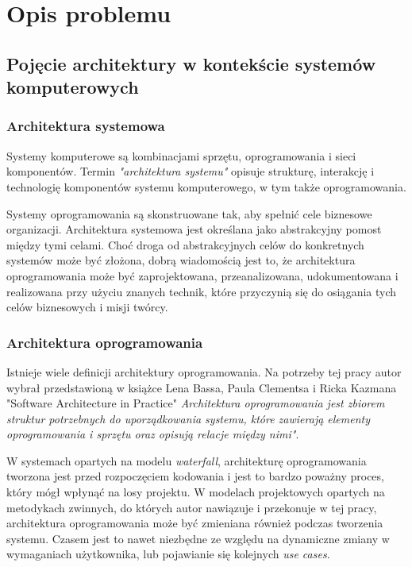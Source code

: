 \chapter{Opis problemu}
\label{opis_problemu}

\section{Pojęcie architektury w kontekście systemów komputerowych}
\subsection{Architektura systemowa}
Systemy komputerowe są kombinacjami sprzętu, oprogramowania i sieci komponentów. Termin \textit{"architektura systemu"} opisuje strukturę, interakcję i technologię komponentów systemu komputerowego, w tym także oprogramowania.

Systemy oprogramowania są skonstruowane tak, aby spełnić cele biznesowe organizacji. Architektura systemowa jest określana jako abstrakcyjny pomost między tymi celami. Choć droga od abstrakcyjnych celów do konkretnych systemów może być złożona, dobrą wiadomością jest to, że architektura oprogramowania może być zaprojektowana, przeanalizowana, udokumentowana i realizowana przy użyciu znanych technik, które przyczynią się do osiągania tych celów biznesowych i misji twórcy. 


\subsection{Architektura oprogramowania}
Istnieje wiele definicji architektury oprogramowania. Na potrzeby tej pracy autor wybrał przedstawioną w książce Lena Bassa, Paula Clementsa i Ricka Kazmana "Software Architecture in Practice"\cite{bib:architect:software} \textit{Architektura oprogramowania jest zbiorem struktur potrzebnych do uporządkowania systemu, które zawierają elementy oprogramowania i sprzętu oraz opisują relacje między nimi"}. 

W systemach opartych na modelu \textit{waterfall}, architekturę oprogramowania tworzona jest przed rozpoczęciem kodowania i jest to bardzo poważny proces, który mógł wpłynąć na losy projektu. W modelach projektowych opartych na metodykach zwinnych, do których autor nawiązuje i przekonuje w tej pracy, architektura oprogramowania może być zmieniana również podczas tworzenia systemu. Czasem jest to nawet niezbędne ze względu na dynamiczne zmiany w wymaganiach użytkownika, lub pojawianie się kolejnych \textit{use cases}.

